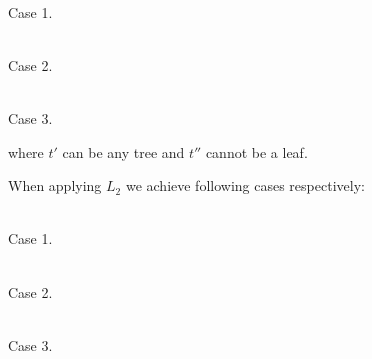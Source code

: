 \documentclass[final]{article}
\theoremstyle{definition}
\theoremstyle{definition}
\theoremstyle{remark}
\begin{document}
\begin{center}
    \begin{minipage}[t]{.3\textwidth}
        \begin{center}
            \\
            Case 1.
        \end{center}
    \end{minipage}%
    \begin{minipage}[t]{.3\textwidth}
        \begin{center}
            \\
            Case 2.
        \end{center}
    \end{minipage}%
    \begin{minipage}[t]{.3\textwidth}
        \begin{center}
            \\
            Case 3.
        \end{center}
    \end{minipage}%
\end{center}

where \(t'\) can be any tree and \(t''\) cannot be a leaf.

When applying \(L_2\) we achieve following cases respectively:

\begin{center}
    \begin{minipage}[t]{.3\textwidth}
        \begin{center}
            \\
            Case 1.
        \end{center}
    \end{minipage}%
    \begin{minipage}[t]{.3\textwidth}
        \begin{center}
            \\
            Case 2.
        \end{center}
    \end{minipage}%
    \begin{minipage}[t]{.3\textwidth}
        \begin{center}
            \\
            Case 3.
        \end{center}
    \end{minipage}%
\end{center}
\end{document}
